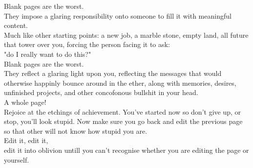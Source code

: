 \begin{abstract}
    
\end{abstract}
\newpage
\clearpage
\begin{center}
    \thispagestyle{empty}
    \vspace*{\fill}
    \epigraph{
        Blank pages are the worst.\\
        They impose a glaring responsibility onto someone to fill it with meaningful content.\\
        Much like other starting points:
        a new job, a marble stone, empty land, all future that tower over you, forcing the person facing it to ask:\\
        "do I really want to do this?"\\
        Blank pages are the worst.\\
        They reflect a glaring light upon you, reflecting the messages that would otherwise happinly bounce around in the ether, along with memories, desires, unfinished projects, and other concofonous bullshit in your head.\\
        A whole page!\\
        Rejoice at the etchings of achievement. You've started now so don't give up, or stop, you'll look stupid. Now make sure you go back and edit the previous page so that other will not know how stupid you are.\\
        Edit it, edit it,\\
        edit it into oblivion untill you can't recognise whether you are editing the page or yourself.}{}
    \vspace*{\fill}
\end{center}
\clearpage

